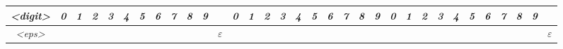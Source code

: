 \documentclass[10pt,twoside,a4paper]{memoir}
\begin{document}
\begin{center}
\begin{tabular}{ |c||c|c|c|c|c|c|c|c|c|c|c|c|c|c|c|c|c|c|c|c|c|c|c|c|c|c|c|c|c|c|c|c| }
\textsl{\textless digit\textgreater} & \textit{0} & \textit{1} & \textit{2} & \textit{3} & \textit{4} & \textit{5} & \textit{6} & \textit{7} & \textit{8} & \textit{9} &  & \textit{0} & \textit{1} & \textit{2} & \textit{3} & \textit{4} & \textit{5} & \textit{6} & \textit{7} & \textit{8} & \textit{9} & \textit{0} & \textit{1} & \textit{2} & \textit{3} & \textit{4} & \textit{5} & \textit{6} & \textit{7} & \textit{8} & \textit{9} & \\ \hline
\textsl{\textless eps\textgreater} &  &  &  &  &  &  &  &  &  &  & $\varepsilon$ &  &  &  &  &  &  &  &  &  &  &  &  &  &  &  &  &  &  &  &  & $\varepsilon$\\
\hline
\end{tabular}

\end{center}
\end{document}
